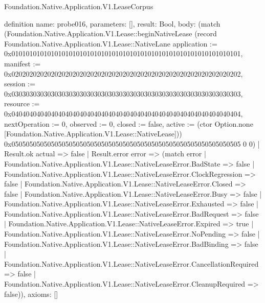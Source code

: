 \begin{lexlean}{Foundation.Native.Application.V1.LeaseCorpus}
\begin{semanticmodule}
definition{
  name: probe016,
  parameters: [],
  result: Bool,
  body: (match (Foundation.Native.Application.V1.Lease::beginNativeLease (record Foundation.Native.Application.V1.Lease::NativeLane {application := 0x0101010101010101010101010101010101010101010101010101010101010101, manifest := 0x0202020202020202020202020202020202020202020202020202020202020202, session := 0x0303030303030303030303030303030303030303030303030303030303030303, resource := 0x0404040404040404040404040404040404040404040404040404040404040404, nextOperation := 0, observed := 0, closed := false, active := (ctor Option.none [Foundation.Native.Application.V1.Lease::NativeLease])}) 0x0505050505050505050505050505050505050505050505050505050505050505 0 0)
    | Result.ok actual => false
    | Result.error error => (match error
      | Foundation.Native.Application.V1.Lease::NativeLeaseError.BadState => false
      | Foundation.Native.Application.V1.Lease::NativeLeaseError.ClockRegression => false
      | Foundation.Native.Application.V1.Lease::NativeLeaseError.Closed => false
      | Foundation.Native.Application.V1.Lease::NativeLeaseError.Busy => false
      | Foundation.Native.Application.V1.Lease::NativeLeaseError.Exhausted => false
      | Foundation.Native.Application.V1.Lease::NativeLeaseError.BadRequest => false
      | Foundation.Native.Application.V1.Lease::NativeLeaseError.Expired => true
      | Foundation.Native.Application.V1.Lease::NativeLeaseError.NoPending => false
      | Foundation.Native.Application.V1.Lease::NativeLeaseError.BadBinding => false
      | Foundation.Native.Application.V1.Lease::NativeLeaseError.CancellationRequired => false
      | Foundation.Native.Application.V1.Lease::NativeLeaseError.CleanupRequired => false)),
  axioms: []
}


\end{semanticmodule}
\end{lexlean}
